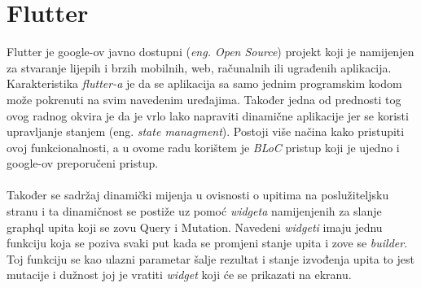 \documentclass[times, utf8, zavrsni]{fer}
\begin{document}
\section{Flutter}
Flutter je google-ov javno dostupni (\textit{eng. Open Source}) projekt koji je namijenjen
za stvaranje lijepih i brzih mobilnih, web, računalnih ili ugrađenih aplikacija. Karakteristika
\textit{flutter-a } je da se aplikacija sa samo jednim programskim kodom može pokrenuti na
svim navedenim uređajima. Također jedna od prednosti tog ovog radnog okvira je da je vrlo lako napraviti
dinamične aplikacije jer se koristi upravljanje stanjem (eng. \textit{state managment}). Postoji više načina
kako pristupiti ovoj funkcionalnosti, a u ovome radu korištem je \textit{BLoC} pristup koji je ujedno
i google-ov preporučeni pristup.
\\\\
Također se sadržaj dinamički mijenja u ovisnosti o upitima na poslužiteljsku stranu i ta dinamičnost
se postiže uz pomoć \textit{widgeta} namijenjenih za slanje graphql upita koji se zovu Query i Mutation.
Navedeni \textit{widgeti} imaju jednu funkciju koja se poziva svaki put kada se promjeni stanje upita i
zove se \textit{builder}. Toj funkciju se kao ulazni parametar šalje rezultat i stanje izvođenja upita to jest mutacije
i dužnost joj je vratiti \textit{widget} koji će se prikazati na ekranu.
\end{document}
